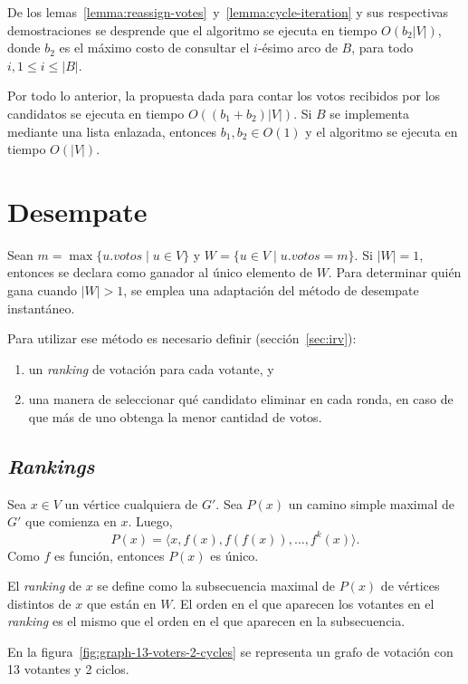 De los lemas~\ref{lemma:reassign-votes}~y~\ref{lemma:cycle-iteration} y sus respectivas demostraciones se desprende que el algoritmo \cyclevotescaption \;se ejecuta en tiempo $O(b_2|V|)$, donde $b_2$ es el m\'aximo costo de consultar el $i$-\'esimo arco de $B$, para todo $i, 1 \leq i \leq |B|$.

Por todo lo anterior, la propuesta dada para contar los votos recibidos por los candidatos se ejecuta en tiempo $O((b_1 + b_2)|V|)$. Si $B$ se implementa mediante una lista enlazada, entonces $b_1, b_2 \in O(1)$ y el algoritmo \dfscaption \;se ejecuta en tiempo $O(|V|)$.


\section{Desempate}
Sean $m = \max\{ u.votos \;|\; u \in V \}$ y $W = \{ u \in V \;|\; u.votos = m \}$.  Si $|W| = 1$, entonces se declara como ganador al \'unico elemento de $W$. Para determinar qui\'en gana cuando $|W| > 1$, se emplea una adaptaci\'on del m\'etodo de desempate instant\'aneo. 

Para utilizar ese m\'etodo es necesario definir (secci\'on~\ref{sec:irv}):
\begin{enumerate}
    \item un \textit{ranking} de votaci\'on para cada votante, y
    \item una manera de seleccionar qu\'e candidato eliminar en cada ronda, en caso de que m\'as de uno  obtenga la menor cantidad de votos.
\end{enumerate}  

\subsection{\textit{Rankings}}
Sea $x \in V$ un v\'ertice cualquiera de $G'$. Sea $P(x)$ un camino simple maximal de $G'$ que comienza en $x$. Luego,
$$
P(x) = \langle x, f(x), f(f(x)), \ldots, f^{k}(x) \rangle.
$$
Como $f$ es funci\'on, entonces $P(x)$ es \'unico. 

El \textit{ranking} de $x$ se define como  la subsecuencia maximal de $P(x)$ de v\'ertices distintos de $x$ que est\'an en $W$. El orden en el que aparecen los votantes en el \textit{ranking} es el mismo que el orden en el que aparecen en la subsecuencia.

En la figura~\ref{fig:graph-13-voters-2-cycles} se representa un grafo de votaci\'on con 13 votantes y 2 ciclos.


